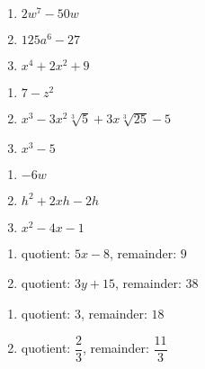 \documentclass{ximera}
\begin{document}
\begin{multicols}{3}
\begin{enumerate}
\setcounter{enumi}{\value{HW}}

\item $2w^7 - 50w$
\item $125a^6 - 27$
\item $x^4+2x^2+9$


\setcounter{HW}{\value{enumi}}
\end{enumerate}
\end{multicols}

\begin{multicols}{3}
\begin{enumerate}
\setcounter{enumi}{\value{HW}}

\item $7-z^2$
\item $x^3 - 3x^2\sqrt[3]{5} + 3x\sqrt[3]{25} - 5$
\item $x^3 - 5$

\setcounter{HW}{\value{enumi}}
\end{enumerate}
\end{multicols}

\begin{multicols}{3}
\begin{enumerate}
\setcounter{enumi}{\value{HW}}


\item $-6w$
\item $h^2 + 2xh - 2h$
\item $x^2 - 4x - 1$ 

\setcounter{HW}{\value{enumi}}
\end{enumerate}
\end{multicols}



\begin{multicols}{2}
\begin{enumerate}
\setcounter{enumi}{\value{HW}}

\item quotient: $5x-8$, remainder: $9$ 
\item quotient: $3y+15$, remainder: $38$

\setcounter{HW}{\value{enumi}}
\end{enumerate}
\end{multicols}


\begin{multicols}{2}
\begin{enumerate}
\setcounter{enumi}{\value{HW}}

\item quotient: $3$, remainder: $18$ 
\item quotient: $\dfrac{2}{3}$, remainder: $\dfrac{11}{3}$

\setcounter{HW}{\value{enumi}}
\end{enumerate}
\end{multicols}
\end{document}
